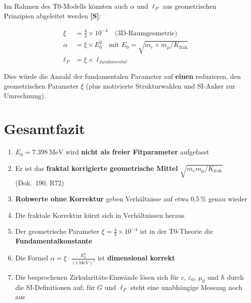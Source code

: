 	Im Rahmen des T0-Modells könnten auch $\alpha$ und $\ell_P$ aus geometrischen Prinzipien abgeleitet werden \textbf{[S]}:
	
	\begin{align}
		\xi &= \frac{4}{3} \times 10^{-4} \quad \text{(3D-Raumgeometrie)}\\
		\alpha &= \xi \times E_0^2 \quad \text{mit } E_0 = \sqrt{m_e \times m_\mu / K_{\text{frak}}}\\
		\ell_P &= \xi \times \ell_{fundamental}
	\end{align}
	
	Dies würde die Anzahl der fundamentalen Parameter auf \textbf{einen} reduzieren, den geometrischen Parameter $\xi$ (plus motivierte Strukturwahlen und SI-Anker zur Umrechnung).
	
	\section{Gesamtfazit}
	
	\begin{tcolorbox}[colback=red!5!white,colframe=red!75!black,title=Zusammenfassung]
		\begin{enumerate}
			\item $E_0 = \SI{7.398}{\MeV}$ wird \textbf{nicht als freier Fitparameter} aufgefasst
			\item Er ist das \textbf{fraktal korrigierte geometrische Mittel} $\sqrt{m_e m_\mu/K_{\text{frak}}}$ (Dok.~190, R72)
			\item \textbf{Rohwerte ohne Korrektur} geben Verhältnisse auf etwa 0,5\,\% genau wieder
			\item Die fraktale Korrektur kürzt sich in Verhältnissen heraus
			\item Der geometrische Parameter $\xi = \frac{4}{3} \times 10^{-4}$ ist in der T0-Theorie die \textbf{Fundamentalkonstante}
			\item Die Formel $\alpha = \xi \cdot \frac{E_0^2}{( \SI{1}{\MeV} )^2}$ ist \textbf{dimensional korrekt}
			\item Die besprochenen Zirkularitäts-Einwände lösen sich für $c$, $\varepsilon_0$, $\mu_0$ und $\hbar$ durch die SI-Definitionen auf; für $G$ und $\ell_P$ steht eine unabhängige Messung noch aus
		\end{enumerate}
	\end{tcolorbox}
	
	\vspace{1cm}
	
